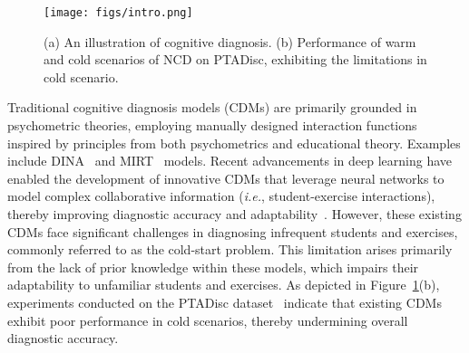 \begin{figure}
    \vspace{-0.5em}
  \centering
  \texttt{[image: figs/intro.png]}
  \caption{(a) An illustration of cognitive diagnosis.
  (b) Performance of warm and cold scenarios of NCD on PTADisc, exhibiting the limitations in cold scenario.}
    \vspace{-2em}
\label{fig: intro}

\end{figure}
Traditional cognitive diagnosis models (CDMs) are primarily grounded in psychometric theories, employing manually designed interaction functions inspired by principles from both psychometrics and educational theory. Examples include DINA~\cite{de2009dina} and MIRT~\cite{reckase200618} models. 
Recent advancements in deep learning have enabled the development of innovative CDMs that leverage neural networks to model complex collaborative information (\textit{i.e.}, student-exercise interactions), thereby improving diagnostic accuracy and adaptability~\cite{wang2020neural, gao2021rcd}. 
However, these existing CDMs face significant challenges in diagnosing infrequent students and exercises, commonly referred to as the cold-start problem. This limitation arises primarily from the lack of prior knowledge within these models, which impairs their adaptability to unfamiliar students and exercises. As depicted in Figure~\ref{fig: intro}(b), experiments conducted on the PTADisc dataset~\cite{hu2023ptadisc} indicate that existing CDMs exhibit poor performance in cold scenarios, thereby undermining overall diagnostic accuracy.



